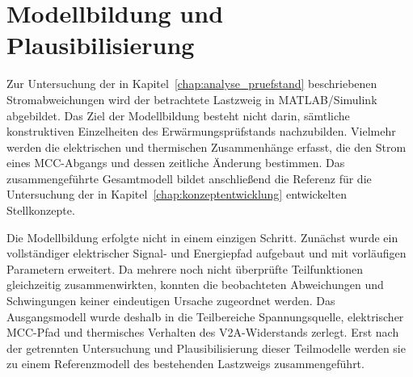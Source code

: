 %
%
%

\section{Modellbildung und Plausibilisierung}
\label{chap:modellbildung}

Zur Untersuchung der in Kapitel~\ref{chap:analyse_pruefstand}
beschriebenen Stromabweichungen wird der betrachtete Lastzweig in
MATLAB/Simulink abgebildet. Das Ziel der Modellbildung besteht nicht darin,
sämtliche konstruktiven Einzelheiten des Erwärmungsprüfstands nachzubilden.
Vielmehr werden die elektrischen und thermischen Zusammenhänge erfasst, die
den Strom eines MCC-Abgangs und dessen zeitliche Änderung bestimmen. Das
zusammengeführte Gesamtmodell bildet anschließend die Referenz für die
Untersuchung der in Kapitel~\ref{chap:konzeptentwicklung} entwickelten
Stellkonzepte.

Die Modellbildung erfolgte nicht in einem einzigen Schritt. Zunächst wurde
ein vollständiger elektrischer Signal- und Energiepfad aufgebaut und mit
vorläufigen Parametern erweitert. Da mehrere noch nicht überprüfte
Teilfunktionen gleichzeitig zusammenwirkten, konnten die beobachteten
Abweichungen und Schwingungen keiner eindeutigen Ursache zugeordnet werden.
Das Ausgangsmodell wurde deshalb in die Teilbereiche Spannungsquelle,
elektrischer MCC-Pfad und thermisches Verhalten des V2A-Widerstands zerlegt.
Erst nach der getrennten Untersuchung und Plausibilisierung dieser
Teilmodelle werden sie zu einem Referenzmodell des bestehenden Lastzweigs
zusammengeführt.


